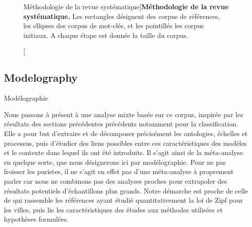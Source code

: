 \begin{figure}[h!]
\caption[Systematic Review][Méthodologie de la revue systématique]{\label{fig:modelography:systematicreview}}{\textbf{Méthodologie de la revue systématique.} Les rectangles désignent des corpus de références, les ellipses des corpus de mot-clés, et les pointillés les corpus initiaux. A chaque étape est donnée la taille du corpus.\label{fig:modelography:systematicreview}}
\end{figure}




\subsection{Modelography}{Modélographie}

Nous passons à présent à une analyse mixte basée sur ce corpus, inspirée par les résultats des sections précédentes précédents notamment pour la classification. Elle a pour but d'extraire et de décomposer précisément les ontologies, échelles et processus, puis d'étudier des liens possibles entre ces caractéristiques des modèles et le contexte dans lequel ils ont été introduits. Il s'agit ainsi de la méta-analyse en quelque sorte, que nous désignerons ici par modélographie. Pour ne pas froisser les puristes, il ne s'agit en effet pas d'une méta-analyse à proprement parler car nous ne combinons pas des analyses proches pour extrapoler des résultats potentiels d'échantillons plus grands. Notre démarche est proche de celle de \cite{10.1371/journal.pone.0183919} qui rassemble les références ayant étudié quantitativement la loi de Zipf pour les villes, puis lie les caractéristiques des études aux méthodes utilisées et hypothèses formulées.


